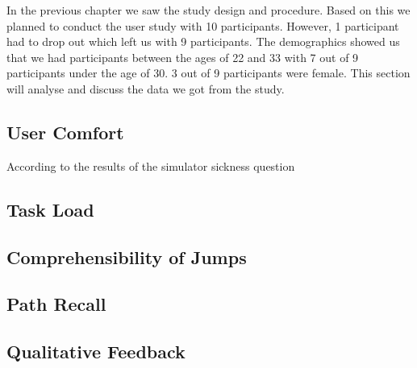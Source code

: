 \label{Chapter:Evaluation of the User Study}
In the previous chapter we saw the study design and procedure. Based on this we planned to conduct the user study with 10 participants. However, 1 participant had to drop out which left us with 9 participants. The demographics showed us that we had participants between the ages of 22 and 33 with 7 out of 9 participants under the age of 30. 3 out of 9 participants were female. This section will analyse and discuss the data we got from the study.

\subsection{User Comfort}
\label{subsection EUS: User Comfort}
According to the results of the simulator sickness question

\subsection{Task Load}
\label{subsection EUS: Task Load}
\subsection{Comprehensibility of Jumps}
\label{subsection EUS: Comprehensibility of Jumps}
\subsection{Path Recall}
\label{subsection EUS: Path Recall}
\subsection{Qualitative Feedback}
\label{subsection EUS: Qualitative Feedback}